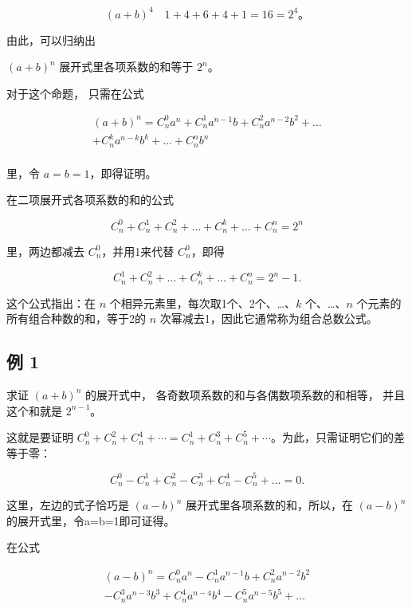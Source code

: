 \[
(a+b)^4\quad 1+4+6+4+1=16=2^4\text{。}
\]

由此，可以归纳出

\((a+b)^n\) 展开式里各项系数的和等于 \(2^n\)。

对于这个命题， 只需在公式

\[
\begin{array}{l} (a + b) ^ {n} = C _ {n} ^ {0} a ^ {n} + C _ {n} ^ {1} a ^ {n - 1} b + C _ {n} ^ {2} a ^ {n - 2} b ^ {2} + \dots \\ + C _ {n} ^ {k} a ^ {n - k} b ^ {k} + \dots + C _ {n} ^ {n} b ^ {n} \\ \end{array}
\]

里，令 \(a = b = 1\)，即得证明。

在二项展开式各项系数的和的公式

\[
C _ {n} ^ {0} + C _ {n} ^ {1} + C _ {n} ^ {2} + \dots + C _ {n} ^ {k} + \dots + C _ {n} ^ {n} = 2 ^ {n}
\]

里，两边都减去 \(C_{n}^{0}\)，并用1来代替 \(C_{n}^{0}\)，即得

\[
C _ {n} ^ {1} + C _ {n} ^ {2} + \dots + C _ {n} ^ {k} + \dots + C _ {n} ^ {n} = 2 ^ {n} - 1.
\]

这个公式指出：在 \(n\) 个相异元素里，每次取1个、2个、\ldots、\(k\)
个、\ldots、\(n\) 个元素的所有组合种数的和，等于2的 \(n\)
次幂减去1，因此它通常称为组合总数公式。

\subsection{例 1}

求证 \((a+b)^{n}\) 的展开式中， 各奇数项系数的和与各偶数项系数的和相等，
并且这个和就是 \(2^{n-1}\)。

 这就是要证明
\(C_n^0+C_n^2+C_n^4+\cdots=C_n^1+C_n^3+C_n^5+\cdots\)。为此，只需证明它们的差等于零：

\[
C _ {n} ^ {0} - C _ {n} ^ {1} + C _ {n} ^ {2} - C _ {n} ^ {3} + C _ {n} ^ {4} - C _ {n} ^ {5} + \dots = 0.
\]

这里，左边的式子恰巧是 \((a-b)^{n}\) 展开式里各项系数的和，所以，在
\((a-b)^{n}\) 的展开式里，令a=b=1即可证得。

 在公式

\[
\begin{array}{l} (a - b) ^ {n} = C _ {n} ^ {0} a ^ {n} - C _ {n} ^ {1} a ^ {n - 1} b + C _ {n} ^ {2} a ^ {n - 2} b ^ {2} \\ - C _ {n} ^ {3} a ^ {n - 3} b ^ {3} + C _ {n} ^ {4} a ^ {n - 4} b ^ {4} - C _ {n} ^ {5} a ^ {n - 5} b ^ {5} + \dots \\ \end{array}
\]

